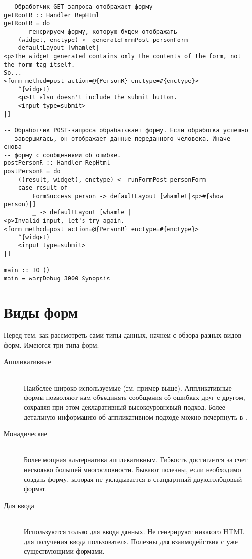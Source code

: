 \begin{lstlisting}
-- Обработчик GET-запроса отображает форму
getRootR :: Handler RepHtml
getRootR = do
    -- генерируем форму, которую будем отображать
    (widget, enctype) <- generateFormPost personForm
    defaultLayout [whamlet|
<p>The widget generated contains only the contents of the form, not the form tag itself.
So...
<form method=post action=@{PersonR} enctype=#{enctype}>
    ^{widget}
    <p>It also doesn't include the submit button.
    <input type=submit>
|]

-- Обработчик POST-запроса обрабатывает форму. Если обработка успешно 
-- завершилась, он отображает данные переданного человека. Иначе -- снова
-- форму с сообщениями об ошибке.
postPersonR :: Handler RepHtml
postPersonR = do
    ((result, widget), enctype) <- runFormPost personForm
    case result of
        FormSuccess person -> defaultLayout [whamlet|<p>#{show person}|]
        _ -> defaultLayout [whamlet|
<p>Invalid input, let's try again.
<form method=post action=@{PersonR} enctype=#{enctype}>
    ^{widget}
    <input type=submit>
|]

main :: IO ()
main = warpDebug 3000 Synopsis
\end{lstlisting}

\section{Виды форм}
Перед тем, как рассмотреть сами типы данных, начнем с обзора разных видов форм. Имеются
три типа
форм:

\begin{description}
\item[Аппликативные] \hfill \\
Наиболее широко используемые (см. пример выше). Аппликативные формы
позволяют нам объединять сообщения об ошибках друг с другом, сохраняя при этом
декларативный высокоуровневый подход. Более детальную информацию об аппликативном подходе
можно почерпнуть в 
.

\item[Монадические] \hfill \\
Более мощная альтернатива аппликативным. Гибкость достигается за счет несколько большей
многословности. Бывают полезны, если необходимо создать форму, которая не укладывается в
стандартный двухстолбцовый формат.

\item[Для ввода] \hfill \\
Используются только для ввода данных. Не генерируют никакого HTML для получения ввода
пользователя. Полезны для взаимодействия с уже существующими формами.
\end{description}


